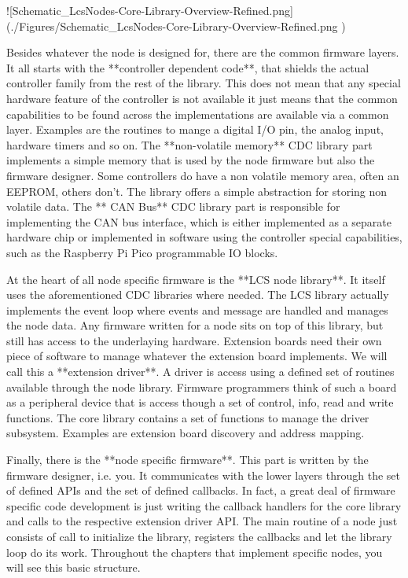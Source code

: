 ![Schematic_LcsNodes-Core-Library-Overview-Refined.png](./Figures/Schematic_LcsNodes-Core-Library-Overview-Refined.png )

Besides whatever the node is designed for, there are the common firmware layers. It all starts with the **controller dependent code**, that shields the actual controller family from the rest of the library. This does not mean that any special hardware feature of the controller is not available it just means that the common capabilities to be found across the implementations are available via a common layer. Examples are the routines to mange a digital I/O pin, the analog input, hardware timers and so on. The **non-volatile memory** CDC library part implements a simple memory that is used by the node firmware but also the firmware designer. Some controllers do have a non volatile memory area, often an EEPROM, others don't. The library offers a simple abstraction for storing non volatile data. The ** CAN Bus** CDC library part is responsible for implementing the CAN bus interface, which is either implemented as a separate hardware chip or implemented in software using the controller special capabilities, such as the Raspberry Pi Pico programmable IO blocks.

At the heart of all node specific firmware is the **LCS node library**. It itself uses the aforementioned CDC libraries where needed. The LCS library actually implements the event loop where events and message are handled and manages the node data. Any firmware written for a node sits on top of this library, but still has access to the underlaying hardware. Extension boards need their own piece of software to manage whatever the extension board implements. We will call this a **extension driver**. A driver is access using a defined set of routines available through the node library. Firmware programmers think of such a board as a peripheral device that is access though a set of control, info, read and write functions. The core library contains a set of functions to manage the driver subsystem. Examples are extension board discovery and address mapping.

Finally, there is the **node specific firmware**. This part is written by the firmware designer, i.e. you. It communicates with the lower layers through the set of defined APIs and the set of defined callbacks. In fact, a great deal of firmware specific code development is just writing the callback handlers for the core library and calls to the respective extension driver API.  The main routine of a node just consists of call to initialize the library, registers the callbacks and let the library loop do its work. Throughout the chapters that implement specific nodes, you will see this basic structure.

